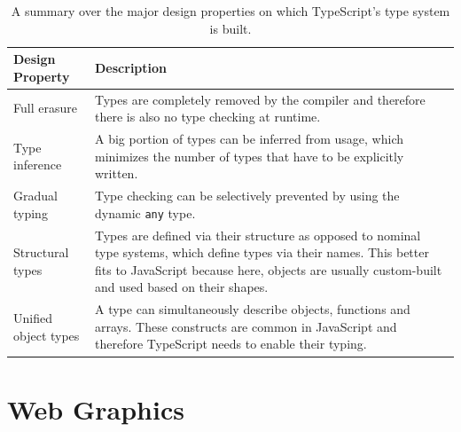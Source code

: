 \begin{table}[tp]
    \centering
    \begin{tabularx}{\linewidth}{| l | X |}
        \hline
        \textbf{Design Property} & \textbf{Description}                                                                                                                                                                                                        \\ \hline
        Full erasure             & Types are completely removed by the compiler and therefore there is also no type checking at runtime.                                                                                                                       \\ \hline
        Type inference           & A big portion of types can be inferred from usage, which minimizes the number of types that have to be explicitly written.                                                                                               \\ \hline
        Gradual typing           & Type checking can be selectively prevented by using the dynamic \lstinline{any} type.                                                                                                                                       \\ \hline
        Structural types         & Types are defined via their structure as opposed to nominal type systems, which define types via their names. This better fits to JavaScript because here, objects are usually custom-built and used based on their shapes. \\ \hline
        Unified object types     & A type can simultaneously describe objects, functions and arrays. These constructs are common in JavaScript and therefore TypeScript needs to enable their typing.                                                          \\ \hline
    \end{tabularx}
    \caption[TypeScript Type System Design Properties]
    {
        A summary over the major design properties on which TypeScript's type system is built.
    }
    \label{tab:TSTypeSystemDesignProperties}
\end{table}


\section{Web Graphics}

